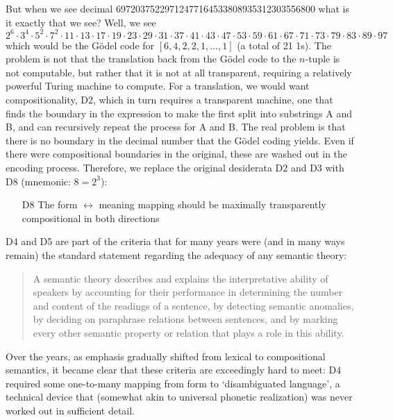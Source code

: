 \documentclass[output=paper,colorlinks=true,citecolor=brown]{langscibook}
\begin{document}
But when we see decimal 69720375229712477164533808935312303556800 what is it
exactly that we see? Well, we see $2^6\cdot 3^4\cdot 5^2\cdot 7^2\cdot 11\cdot
13\cdot 17\cdot 19\cdot 23\cdot 29\cdot 31\cdot 37\cdot 41\cdot 43\cdot
47\cdot 53\cdot 59\cdot 61\cdot 67\cdot 71\cdot 73\cdot 79\cdot 83\cdot
89\cdot 97$ which would be the Gödel code for $[6,4,2,2,1,\ldots,1]$ (a
total of 21 1s). The problem is not that the translation back from the Gödel
code to the $n$-tuple is not computable, but rather that it is not at all
transparent, requiring a relatively powerful Turing machine to compute. For a
translation, we would want compositionality, D2, which in turn requires a
transparent machine, one that finds the boundary in the expression to make the
first split into substrings A and B, and can recursively repeat the process
for A and B. The real problem is that there is no boundary in the decimal
number that the Gödel coding yields. Even if there were compositional
boundaries in the original, these are washed out in the encoding process.
Therefore, we replace the original desiderata D2 and D3 with D8 (mnemonic:
$8=2^3$):

\begin{itemize}
\item[D8] The form $\leftrightarrow$ meaning mapping should be maximally
  transparently compositional in both directions
\end{itemize}

\medskip\noindent D4 and D5 are part of the \citet{Katz:1963} criteria that
for many years were (and in many ways remain) the standard statement regarding
the adequacy of any semantic theory:

\begin{quote}
A semantic theory describes and explains the interpretative ability of
speakers by accounting for their performance in determining the number and
content of the readings of a sentence, by detecting semantic anomalies, by
deciding on paraphrase relations between sentences, and by marking every other
semantic property or relation that plays a role in this ability.
\end{quote}

\noindent 
Over the years, as emphasis gradually shifted from lexical to compositional
semantics, it became clear that these criteria are exceedingly hard to meet:
D4 required some one-to-many mapping from form to `disambiguated language', a
technical device that (somewhat akin to universal phonetic realization) was
never worked out in sufficient detail.
\end{document}
